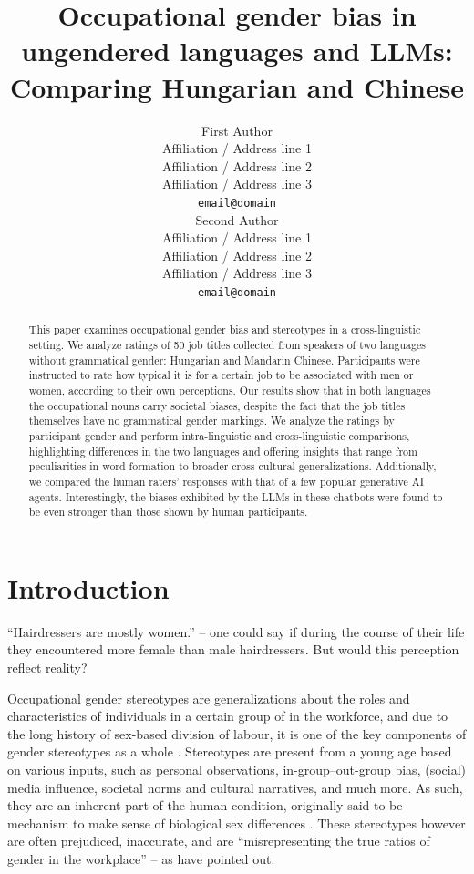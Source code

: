 \documentclass[11pt]{article}
\title{Occupational gender bias in ungendered languages and LLMs: Comparing Hungarian and Chinese}
\author{First Author \\
  Affiliation / Address line 1 \\
  Affiliation / Address line 2 \\
  Affiliation / Address line 3 \\
  \texttt{email@domain} \\\And
  Second Author \\
  Affiliation / Address line 1 \\
  Affiliation / Address line 2 \\
  Affiliation / Address line 3 \\
  \texttt{email@domain} \\}
\begin{document}
\maketitle

\begin{abstract}
This paper examines occupational gender bias and stereotypes in a cross-linguistic setting. We analyze ratings of 50 job titles collected from speakers of two languages without grammatical gender: Hungarian and Mandarin Chinese. Participants were instructed to rate how typical it is for a certain job to be associated with men or women, according to their own perceptions.
Our results show that in both languages the occupational nouns carry societal biases, despite the fact that the job titles themselves have no grammatical gender markings. We analyze the ratings by participant gender and perform intra-linguistic and cross-linguistic comparisons, highlighting differences in the two languages and offering insights that range from peculiarities in word formation to broader cross-cultural generalizations.
Additionally, we compared the human raters' responses with that of a few popular generative AI agents. Interestingly, the biases exhibited by the LLMs in these chatbots were found to be even stronger than those shown by human participants.

\end{abstract}

\section{Introduction}

``Hairdressers are mostly women.'' -- one could say if during the course of their life they encountered more female than male hairdressers. But would this perception reflect reality?

Occupational gender stereotypes are generalizations about the roles and characteristics of individuals in a certain group of in the workforce, and due to the long history of sex-based division of labour, it is one of the key components of gender stereotypes as a whole \citep{deaux_1984_structure}. Stereotypes are present from a young age \citep{canessapollard_2022_development} based on various inputs, such as personal observations, in-group--out-group bias, (social) media influence, societal norms and cultural narratives, and much more. As such, they are an inherent part of the human condition, originally said to be mechanism to make sense of biological sex differences \citep{levanon_2016_persistence}. These stereotypes however are often prejudiced, inaccurate, and are ``misrepresenting the true ratios of gender in the workplace'' \citep{garnham_2015_true,gygax_2016_what} -- as \citet{kaukonen_2025_gender} have pointed out.
\end{document}
